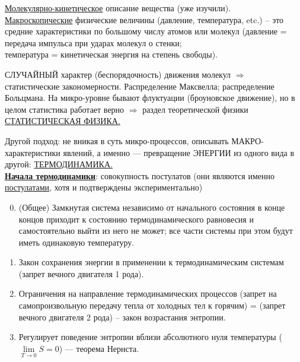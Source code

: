 \sf\Large

\underline{Молекулярно-кинетическое} описание вещества (уже изучили).\\
\underline{Макроскопические} физические величины (давление, температура, etc.) -- это средние характеристики по большому числу атомов или молекул (давление = передача импульса при ударах молекул о стенки;\\
 температура = кинетическая энергия на степень свободы).

СЛУЧАЙНЫЙ характер (беспорядочность) движения молекул $\Rightarrow$ ста\-ти\-с\-ти\-че\-с\-кие закономерности. Распределение Максвелла; распределение Больцмана. На микро-уровне бывают флуктуации (броуновское движение), но в целом статистика работает верно $\Rightarrow$ раздел теоретической физики \underline{СТАТИСТИЧЕСКАЯ ФИЗИКА.}

Другой подход: не вникая в суть микро-процессов, описывать МАКРО-характеристики явлений, а именно --- превращение ЭНЕРГИИ из одного вида в другой: \underline{ТЕРМОДИНАМИКА.}\\

\underline{\bf Начала термодинамики}: совокупность постулатов (они являются именно \underline{постулатами}, хотя и подтверждены экспериментально)
\begin{enumerate}
\setcounter{enumi}{-1}
\item (Общее) Замкнутая система независимо от начального состояния в конце концов приходит к состоянию термодинамического равновесия и самостоятельно выйти из него не может; все части системы при этом будут иметь одинаковую температуру.
\item Закон сохранения энергии в применении к термодинамическим системам (запрет вечного двигателя 1 рода).
\item Ограничения на направление термодинамических процессов (запрет на самопроизвольную передачу тепла от холодных тел к горячим) = (запрет вечного двигателя 2 рода) -- закон возрастания энтропии.
\item Регулирует поведение энтропии вблизи абсолютного нуля температуры ($\lim\limits_{T\rightarrow0}S=0$) --- теорема Нернста.
\end{enumerate}

